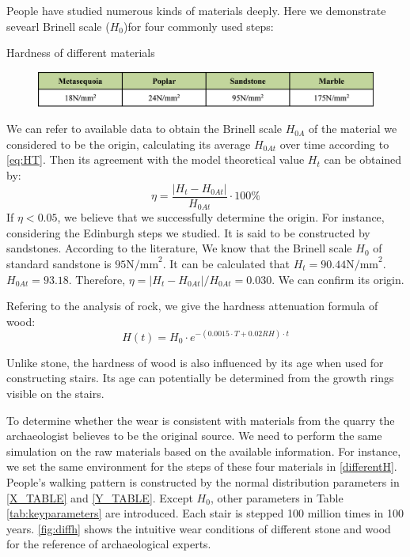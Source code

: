 \documentclass[12pt]{article}  %
\numberwithin{equation}{section} %
\begin{document}
People have studied numerous kinds of materials deeply. Here we demonstrate sevearl Brinell scale ($H_0$)for four commonly used steps\cite{4}\cite{5}:
\begin{table}[H]
    \centering
    \vspace{-0.5em}
    \caption{Hardness of different materials}
    \vspace{-1.0em}
        \begin{figure}[H]
    	\centering
    	\includegraphics[width=0.8\linewidth]{KindsofH.png}
        \end{figure}
    \label{differentH}
    \vspace{-2em}
\end{table}


We can refer to available data to obtain the Brinell scale $H_{0A}$ of the material we considered to be the origin, calculating its average $H_{0At}$ over time according to \eqref{eq:HT}. Then its agreement with the model theoretical value $H_t$ can be obtained by:
\begin{equation}
    \eta = \frac{\left| H_{t} - H_{0At} \right|}{H_{0At}} \cdot 100\%
\end{equation}
If $\eta<0.05$, we believe that we successfully determine the origin. For instance, considering the Edinburgh steps we studied. It is said to be constructed by sandstones. According to the literature, We know that the Brinell scale $H_0$ of standard sandstone is $95\text{N/mm}^2$. It can be calculated that $H_t =90.44\text{N/mm}^2$. $H_{0At} = 93.18$. Therefore, $\eta = {\left| H_{t} - H_{0At} \right|}/{H_{0At}}=0.030 $. We can confirm its origin.

Refering to the analysis of rock, we give the hardness attenuation formula of wood:
\begin{equation}
    H(t) = H_0 \cdot e^{-(0.0015 \cdot T + 0.02 RH) \cdot t}
\end{equation}

Unlike stone, the hardness of wood is also influenced by its age when used for constructing stairs. Its age can potentially be determined from the growth rings visible on the stairs.



To determine whether the wear is consistent with materials from the quarry the archaeologist believes to be the original source. We need to perform the same simulation on the raw materials based on the available information. For instance, we set the same environment for the steps of these four materials in \autoref{differentH}. People's walking pattern is constructed by the normal distribution parameters in \autoref{X_TABLE} and \autoref{Y_TABLE}. Except $H_0$, other parameters in Table \ref{tab:keyparameters} are introduced. Each stair is stepped 100 million times in 100 years. \autoref{fig:diffh} shows the intuitive wear conditions of different stone and wood for the reference of archaeological experts.
\end{document}
